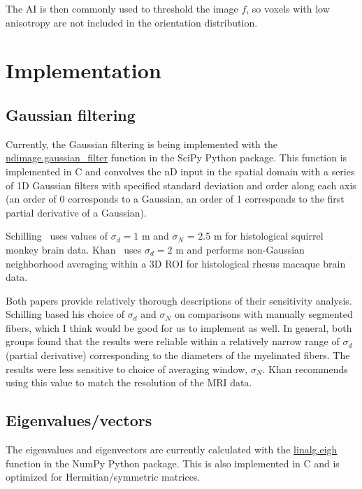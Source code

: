 \documentclass[11pt]{article}
\begin{document}
The AI is then commonly used to threshold the image $f$, so voxels with low
anisotropy are not included in the orientation distribution.

\section{Implementation}

\subsection{Gaussian filtering}

Currently, the Gaussian filtering is being implemented with the
\href{https://docs.scipy.org/doc/scipy-0.16.1/reference/generated/scipy.ndimage.filters.gaussian_filter.html}{ndimage.gaussian\_filter}
function in the SciPy Python package. This function is implemented in C and
convolves the nD input in the spatial domain with a series of 1D Gaussian
filters with specified standard deviation and order along each axis (an order of
0 corresponds to a Gaussian, an order of 1 corresponds to the first partial
derivative of a Gaussian).

Schilling~\cite{Schilling2018} uses values of $\sigma_d=1$ \textmu m and
$\sigma_N$ = 2.5 \textmu m for histological squirrel monkey brain data.
Khan~\cite{Khan2015} uses $\sigma_d=2$ \textmu m and performs non-Gaussian
neighborhood averaging within a 3D ROI for histological rhesus macaque brain
data.

Both papers provide relatively thorough descriptions of their sensitivity
analysis. Schilling based his choice of $\sigma_d$ and $\sigma_N$ on comparisons
with manually segmented fibers, which I think would be good for us to implement
as well. In general, both groups found that the results were reliable within a
relatively narrow range of $\sigma_d$ (partial derivative) corresponding to the
diameters of the myelinated fibers. The results were less sensitive to choice of
averaging window, $\sigma_N$. Khan recommends using this value to match the
resolution of the MRI data.

\subsection{Eigenvalues/vectors}

The eigenvalues and eigenvectors are currently calculated with the
\href{https://docs.scipy.org/doc/numpy/reference/generated/numpy.linalg.eigh.html}{linalg.eigh}
function in the NumPy Python package. This is also implemented in C and is
optimized for Hermitian/symmetric matrices.
\end{document}
